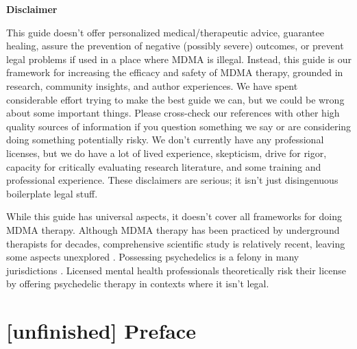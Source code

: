 \documentclass[12pt,letterpaper]{book}
\begin{document}
\newpage
\begin{center}
    \textbf{Disclaimer}

    \vspace{\baselineskip}

    This guide doesn't offer personalized medical/therapeutic advice, guarantee healing, assure the prevention of negative (possibly severe) outcomes, or prevent legal problems if used in a place where MDMA is illegal. Instead, this guide is our framework for increasing the efficacy and safety of MDMA therapy, grounded in research, community insights, and author experiences. We have spent considerable effort trying to make the best guide we can, but we could be wrong about some important things. Please cross-check our references with other high quality sources of information if you question something we say or are considering doing something potentially risky. We don't currently have any professional licenses, but we do have a lot of lived experience, skepticism, drive for rigor, capacity for critically evaluating research literature, and some training and professional experience. These disclaimers are serious; it isn't just disingenuous boilerplate legal stuff.

    \vspace{\baselineskip}

    While this guide has universal aspects, it doesn't cover all frameworks for doing MDMA therapy. Although MDMA therapy has been practiced by underground therapists for decades, comprehensive scientific study is relatively recent, leaving some aspects unexplored \cite{passieHistory}. Possessing psychedelics is a felony in many jurisdictions \cite{alphaLegalization}. Licensed mental health professionals theoretically risk their license by offering psychedelic therapy in contexts where it isn't legal.%
\end{center}
\clearpage

\tableofcontents

\chapter*{[unfinished] Preface}
\end{document}

